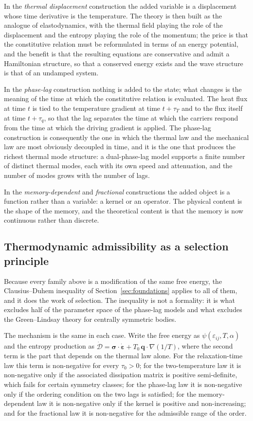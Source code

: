 In the \emph{thermal displacement} construction the added variable is a displacement whose time derivative is the temperature. The theory is then built as the analogue of elastodynamics, with the thermal field playing the role of the displacement and the entropy playing the role of the momentum; the price is that the constitutive relation must be reformulated in terms of an energy potential, and the benefit is that the resulting equations are conservative and admit a Hamiltonian structure, so that a conserved energy exists and the wave structure is that of an undamped system.

In the \emph{phase-lag} construction nothing is added to the state; what changes is the meaning of the time at which the constitutive relation is evaluated. The heat flux at time $t$ is tied to the temperature gradient at time $t + \tau_T$ and to the flux itself at time $t + \tau_q$, so that the lag separates the time at which the carriers respond from the time at which the driving gradient is applied. The phase-lag construction is consequently the one in which the thermal law and the mechanical law are most obviously decoupled in time, and it is the one that produces the richest thermal mode structure: a dual-phase-lag model supports a finite number of distinct thermal modes, each with its own speed and attenuation, and the number of modes grows with the number of lags.

In the \emph{memory-dependent} and \emph{fractional} constructions the added object is a function rather than a variable: a kernel or an operator. The physical content is the shape of the memory, and the theoretical content is that the memory is now continuous rather than discrete.

\subsection{Thermodynamic admissibility as a selection principle}
\label{sec:4.14}

Because every family above is a modification of the same free energy, the Clausius--Duhem inequality of Section~\ref{sec:foundations} applies to all of them, and it does the work of selection. The inequality is not a formality: it is what excludes half of the parameter space of the phase-lag models and what excludes the Green--Lindsay theory for centrally symmetric bodies.

The mechanism is the same in each case. Write the free energy as $\psi(\varepsilon_{ij}, T, \alpha)$ and the entropy production as $\dot{\mathcal{D}} = \bm{\sigma}\cdot\dot{\bm{\varepsilon}} + T_0\,\bm{q}\cdot\nabla(1/T)$, where the second term is the part that depends on the thermal law alone. For the relaxation-time law this term is non-negative for every $\tau_0 > 0$; for the two-temperature law it is non-negative only if the associated dissipation matrix is positive semi-definite, which fails for certain symmetry classes; for the phase-lag law it is non-negative only if the ordering condition on the two lags is satisfied; for the memory-dependent law it is non-negative only if the kernel is positive and non-increasing; and for the fractional law it is non-negative for the admissible range of the order.

